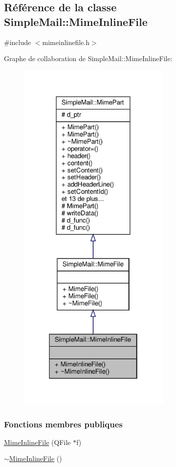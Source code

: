 \hypertarget{class_simple_mail_1_1_mime_inline_file}{}\subsection{Référence de la classe Simple\+Mail\+:\+:Mime\+Inline\+File}
\label{class_simple_mail_1_1_mime_inline_file}


{\ttfamily \#include $<$mimeinlinefile.\+h$>$}



Graphe de collaboration de Simple\+Mail\+:\+:Mime\+Inline\+File\+:\nopagebreak
\begin{figure}[H]
\begin{center}
\leavevmode
\includegraphics[width=214pt]{class_simple_mail_1_1_mime_inline_file__coll__graph}
\end{center}
\end{figure}
\subsubsection*{Fonctions membres publiques}
\begin{DoxyCompactItemize}
\item 
\hyperlink{class_simple_mail_1_1_mime_inline_file_a83ce5e16e7572383274dc1ec3ec47859}{Mime\+Inline\+File} (Q\+File $\ast$f)
\item 
\hyperlink{class_simple_mail_1_1_mime_inline_file_afe834d7017f7e60da5e69d4d108d15c1}{$\sim$\+Mime\+Inline\+File} ()
\end{DoxyCompactItemize}
